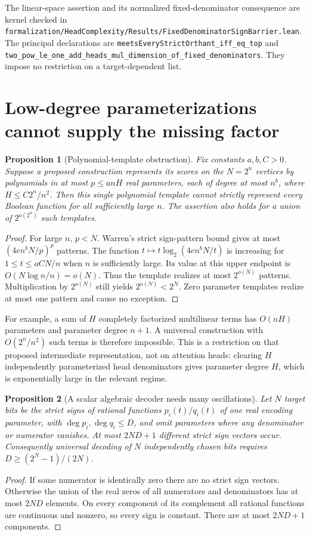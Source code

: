 \documentclass[11pt]{article}
\newtheorem{proposition}{Proposition}
\begin{document}
The linear-space assertion and its normalized fixed-denominator consequence
are kernel checked in
\texttt{formalization/HeadComplexity/Results/FixedDenominatorSignBarrier.lean}.
The principal declarations are
\texttt{meetsEveryStrictOrthant\_iff\_eq\_top} and
\texttt{two\_pow\_le\_one\_add\_heads\_mul\_dimension\_of\_fixed\_denominators}.
They impose no restriction on a target-dependent list.

\section{Low-degree parameterizations cannot supply the missing factor}

\begin{proposition}[Polynomial-template obstruction]
Fix constants $a,b,C>0$. Suppose a proposed construction represents its
scores on the $N=2^n$ vertices by polynomials in at most $p\le anH$
real parameters, each of degree at most $n^b$, where
$H\le C2^n/n^2$. Then this single polynomial template cannot strictly
represent every Boolean function for all sufficiently large $n$.
The assertion also holds for a union of $2^{o(2^n)}$ such templates.
\end{proposition}
\begin{proof}
For large $n$, $p<N$. Warren's strict sign-pattern bound gives at most
$(4en^bN/p)^p$ patterns. The function
$t\mapsto t\log_2(4en^bN/t)$ is increasing for $1\le t\le aCN/n$
when $n$ is sufficiently large. Its value at this upper endpoint is
$O(N\log n/n)=o(N)$. Thus the template realizes at most $2^{o(N)}$
patterns. Multiplication by $2^{o(N)}$ still yields $2^{o(N)}<2^N$.
Zero parameter templates realize at most one pattern and cause no exception.
\end{proof}

For example, a sum of $H$ completely factorized multilinear terms has
$O(nH)$ parameters and parameter degree $n+1$. A universal construction
with $O(2^n/n^2)$ such terms is therefore impossible. This is a restriction
on that proposed intermediate representation, not on attention heads:
clearing $H$ independently parameterized head denominators gives parameter
degree $H$, which is exponentially large in the relevant regime.

\begin{proposition}[A scalar algebraic decoder needs many oscillations]
Let $N$ target bits be the strict signs of rational functions
$p_i(t)/q_i(t)$ of one real encoding parameter, with
$\deg p_i,\deg q_i\le D$, and omit parameters where any denominator or
numerator vanishes. At most $2ND+1$ different strict sign vectors occur.
Consequently universal decoding of $N$ independently chosen bits requires
$D\ge(2^N-1)/(2N)$.
\end{proposition}
\begin{proof}
If some numerator is identically zero there are no strict sign vectors.
Otherwise the union of the real zeros of all numerators and denominators
has at most $2ND$ elements. On every component of its complement all
rational functions are continuous and nonzero, so every sign is constant.
There are at most $2ND+1$ components.
\end{proof}
\end{document}
